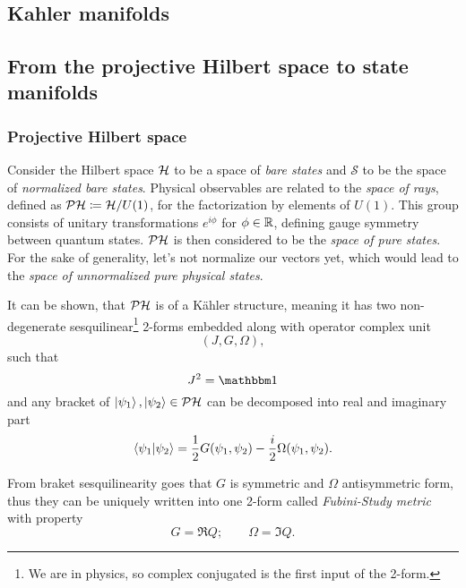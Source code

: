 \chapter{}
\section{Kahler manifolds}

\section{From the projective Hilbert space to state manifolds}

\subsection{Projective Hilbert space}
Consider the Hilbert space $\mathcal{H}$ to be a space of \emph{bare states} and $\mathcal{S}$ to be the space of \emph{normalized bare states}. Physical observables are related to the \emph{space of rays}, defined as $\mathcal{PH}\coloneqq \mathcal{H}/U(1)$, for the factorization by elements of $U(1)$. This group consists of unitary transformations $e^{i\phi}$ for $\phi\in\mathbb{R}$, defining gauge symmetry between quantum states. $\mathcal{PH}$ is then considered to be the \emph{space of pure states}. For the sake of generality, let's not normalize our vectors yet, which would lead to the \emph{space of unnormalized pure physical states}. 

It can be shown, that $\mathcal{PH}$ is of a K\"ahler structure, meaning it has two non-degenerate sesquilinear\footnote{We are in physics, so complex conjugated is the first input of the 2-form.} 2-forms embedded along with operator complex unit
$$(J, G, \Omega),$$
such that
\begin{equation}
    J^2=\Id
\end{equation}
and any bracket of $\ket{\psi_1},\ket{\psi_2}\in \mathcal{PH}$ can be decomposed into real and imaginary part\citep{ashtekar_geometrical_1997}
\begin{equation}
    \braket{\psi_1|\psi_2}=\frac{1}{2}G(\psi_1,\psi_2)-\frac{i}{2}\Omega(\psi_1,\psi_2).
    \label{eq:quantumProd}
\end{equation}

From braket sesquilinearity goes that $G$ is symmetric and $\Omega$ antisymmetric form, thus they can be uniquely written into one 2-form called \emph{Fubini-Study metric} with property
\begin{equation}
    G=\Re Q ;\qquad \Omega=\Im Q.
\end{equation}

